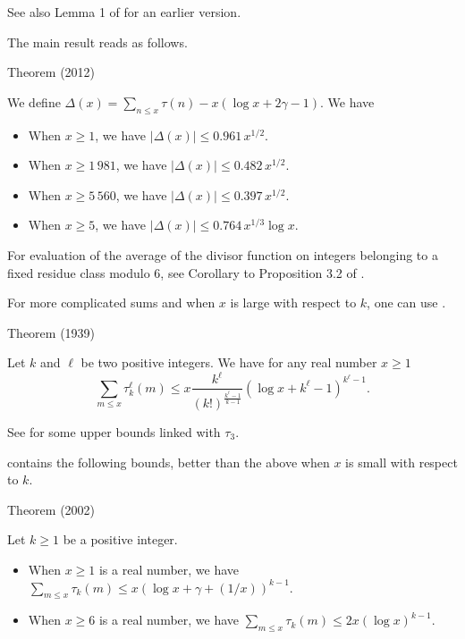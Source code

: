 See also Lemma 1
of \cite{Schoenfeld*69} for an
earlier version.



\par 
The main result
\cite{Berkane-Bordelles-Ramare*11}
reads as follows.
\par 
\begin{thm}{Theorem (2012)}

We define $\Delta(x)=\sum_{n\le x}\tau(n)-x(\log x+2\gamma-1)$. We have
\begin{itemize}
\item  When $x\ge 1$, we have $|\Delta(x)|\le 0.961\, {x^{1/2}}$.

\item  When $x\ge 1\,981$, we have $|\Delta(x)|\le 0.482\, {x^{1/2}}$.

\item  When $x\ge 5\,560$, we have $|\Delta(x)|\le 0.397\, {x^{1/2}}$.

\item  When $x\ge 5$, we have $|\Delta(x)|\le 0.764\, {x^{1/3}\log x}$.

\end{itemize}
\end{thm}


For evaluation of the average of the divisor function on integers belonging to
a fixed residue class modulo 6, see Corollary to Proposition 3.2 of 
\cite{Deshouillers-Dress*88}.



For more complicated sums and when $x$ is large with respect to $k$, one can use
\cite{Mardjanichvili*39}.
\par 
\begin{thm}{Theorem (1939)}

  Let $k$ and $\ell$ be two positive integers. We have for any real number
$x\ge1$ 
$$
 \sum_{m\le x}\tau_k^\ell(m) \le
x\frac{k^\ell}{(k!)^{\frac{k^\ell-1}{k-1}}}(\log x+k^\ell-1)^{k^\ell-1}.  
$$
\end{thm}

See \cite{Deshouillers-Dress*88}
for some upper bounds linked with $\tau_3$.

\par 
\cite{Bordelles*02}
contains the following bounds, better than the above when $x$ is small with
respect to $k$.
\par 
\begin{thm}{Theorem (2002)}

  Let $k\ge1$ be a positive integer.
\begin{itemize}
\item  When  $x\ge1$ is a real number, we have
  $\sum_{m\le x}\tau_k(m)\le x(\log x+\gamma+(1/x))^{k-1}$.

\item  When $x\ge6$ is a real number, we have
  $\sum_{m\le x}\tau_k(m)\le 2x(\log x)^{k-1}$.

\end{itemize}
\end{thm}

